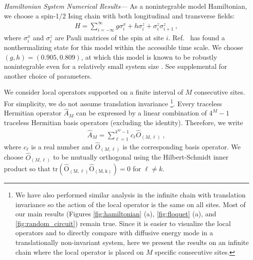 \documentclass[twocolumn,superscriptaddress, prl,showpacs]{revtex4-1}
\begin{document}
{\it Hamiltonian System Numerical Results---}
As a nonintegrable model Hamiltonian, we choose a spin-1/2 Ising chain with both longitudinal and transverse fields:
\begin{align}
H = \sum_{i = -\infty}^{\infty} g\sigma^x_i + h\sigma^z_i + \sigma^z_i \sigma^z_{i+1} ~,
\label{eq:Hamiltonian}
\end{align}
where $\sigma^x_i$ and $\sigma^z_i$ are Pauli matrices of the spin at site $i$.
Ref.~ has found a nonthermalizing state for this model within the accessible time scale.
We choose $(g,h) = (0.905, 0.809)$, at which this model is known to be robustly nonintegrable even for a relatively small system size \cite{Kim:2013}.
See supplemental for another choice of parameters.

We consider local operators supported on a finite interval of $M$ consecutive sites.
For simplicity, we do not assume translation invariance
\footnote{We have also performed similar analysis in the infinite chain with translation invariance so the action of the local operator is the same on all sites. Most of our main results (Figures \ref{fig:hamiltonian} (a), \ref{fig:floquet} (a), and \ref{fig:random_circuit})
remain true. Since it is easier to visualize the local operators and to directly compare with diffusive energy mode in a translationally non-invariant system, here we present the results on an infinite chain where the local operator is placed on $M$ specific consecutive sites.}.
Every traceless Hermitian operator
$\hat{A}_M$ can be expressed by a linear combination of $4^M - 1$ traceless Hermitian basis operators (excluding the identity).
Therefore, we write
\begin{align}
\hat{A}_M = \sum_{\ell = 1}^{4^M - 1} c_\ell \hat{O}_{(M,\ell)} ~,
\end{align}
where $c_\ell$ is a real number and $\hat{O}_{(M,\ell)}$ is the corresponding basis operator.
We choose $\hat{O}_{(M,\ell)}$ to be mutually orthogonal using the Hilbert-Schmidt inner product so that
$\mathrm{tr(\hat{O}_{(M,\ell)} \hat{O}_{(M,k)})} = 0$ for $\ell\neq k$.
\end{document}
